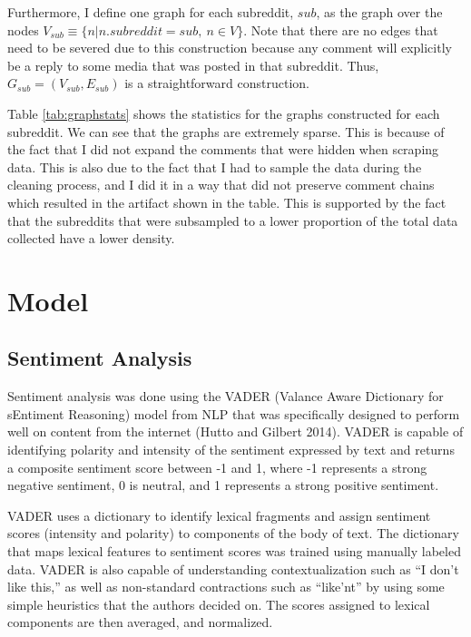 \documentclass[
]{article}
\begin{document}
Furthermore, I define one graph for each subreddit, \(sub\), as the graph over the nodes \(V_{sub}\equiv\{n|n.subreddit=sub,\ n\in V\}\). Note that there are no edges that need to be severed due to this construction because any comment will explicitly be a reply to some media that was posted in that subreddit. Thus, \(G_{sub}=(V_{sub},E_{sub})\) is a straightforward construction.

Table \ref{tab:graphstats} shows the statistics for the graphs constructed for each subreddit. We can see that the graphs are extremely sparse. This is because of the fact that I did not expand the comments that were hidden when scraping data. This is also due to the fact that I had to sample the data during the cleaning process, and I did it in a way that did not preserve comment chains which resulted in the artifact shown in the table. This is supported by the fact that the subreddits that were subsampled to a lower proportion of the total data collected have a lower density.

\hypertarget{model}{%
\section{Model}\label{model}}

\hypertarget{sentiment-analysis}{%
\subsection{Sentiment Analysis}\label{sentiment-analysis}}

Sentiment analysis was done using the VADER (Valance Aware Dictionary for sEntiment Reasoning) model from NLP that was specifically designed to perform well on content from the internet (Hutto and Gilbert 2014). VADER is capable of identifying polarity and intensity of the sentiment expressed by text and returns a composite sentiment score between -1 and 1, where -1 represents a strong negative sentiment, 0 is neutral, and 1 represents a strong positive sentiment.

VADER uses a dictionary to identify lexical fragments and assign sentiment scores (intensity and polarity) to components of the body of text. The dictionary that maps lexical features to sentiment scores was trained using manually labeled data. VADER is also capable of understanding contextualization such as ``I don't like this,'' as well as non-standard contractions such as ``like'nt'' by using some simple heuristics that the authors decided on. The scores assigned to lexical components are then averaged, and normalized.
\end{document}
